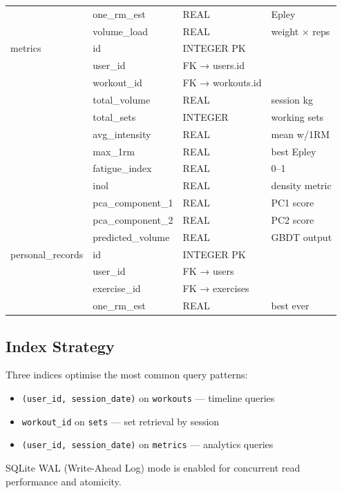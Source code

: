 \documentclass[12pt,a4paper]{report}
\begin{document}
\begin{longtable}{llll}
           & one\_rm\_est & REAL & Epley \\
           & volume\_load & REAL & weight × reps \\
\midrule
metrics    & id          & INTEGER PK & \\
           & user\_id    & FK → users.id & \\
           & workout\_id & FK → workouts.id & \\
           & total\_volume & REAL & session kg \\
           & total\_sets & INTEGER & working sets \\
           & avg\_intensity & REAL & mean w/1RM \\
           & max\_1rm    & REAL & best Epley \\
           & fatigue\_index & REAL & 0--1 \\
           & inol        & REAL & density metric \\
           & pca\_component\_1 & REAL & PC1 score \\
           & pca\_component\_2 & REAL & PC2 score \\
           & predicted\_volume & REAL & GBDT output \\
\midrule
personal\_records & id   & INTEGER PK & \\
           & user\_id    & FK → users & \\
           & exercise\_id & FK → exercises & \\
           & one\_rm\_est & REAL & best ever \\
\end{longtable}

\subsection{Index Strategy}

Three indices optimise the most common query patterns:
\begin{itemize}
  \item \texttt{(user\_id, session\_date)} on \texttt{workouts} — timeline queries
  \item \texttt{workout\_id} on \texttt{sets} — set retrieval by session
  \item \texttt{(user\_id, session\_date)} on \texttt{metrics} — analytics queries
\end{itemize}

SQLite WAL (Write-Ahead Log) mode is enabled for concurrent read performance
and atomicity.
\end{document}
